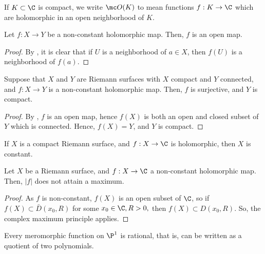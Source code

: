 \documentclass[11pt]{report}
\begin{document}
\begin{notethm*}[Notation]
    If $K \subset \C$ is compact, we write $\mc O(K)$ to mean functions $f:K \to \C$ which are holomorphic in an open neighborhood of $K$.
\end{notethm*}

\begin{cor}[][label=cor:openhol]
    Let $f:X \to Y$ be a non-constant holomorphic map. Then, $f$ is an open map.
\end{cor}

\begin{proof}
    By , it is clear that if $U$ is a neighborhood of $a \in X$, then $f(U)$ is a neighborhood of $f(a)$.
\end{proof}

\begin{thm}
    Suppose that $X$ and $Y$ are Riemann surfaces with $X$ compact and $Y$ connected, and $f:X \to Y$ is a non-constant holomorphic map. Then, $f$ is surjective, and $Y$ is compact.
\end{thm}

\begin{proof}
    By , $f$ is an open map, hence $f(X)$ is both an open and closed subset of $Y$ which is connected. Hence, $f(X) =Y$, and $Y$ is compact. 
\end{proof}

\begin{cor}[][label=cor:compact_hol_constant]
    If $X$ is a compact Riemann surface, and $f:X \to \C$ is holomorphic, then $X$ is constant.
\end{cor}

\begin{cor}
    Let $X$ be a Riemann surface, and $f:X \to \C$ a non-constant holomorphic map. Then, $|f|$ does not attain a maximum.
\end{cor}

\begin{proof}
    As $f$ is non-constant, $f(X)$ is an open subset of $\C$, so if $f(X) \subset \bar D(x_0,R)$ for some $x_0 \in \C,R>0,$ then $f(X) \subset D(x_0,R)$. So, the complex maximum principle applies.
\end{proof}

\begin{cor}
    Every meromorphic function on $\P^1$ is rational, that is, can be written as a quotient of two polynomials.
\end{cor}
\end{document}
